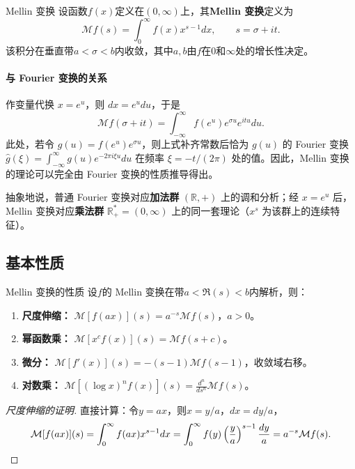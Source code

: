 \begin{definition}{Mellin 变换}{}
设函数$f(x)$定义在$(0,\infty)$上，其\textbf{Mellin 变换}定义为
\[
\mathcal{M}f(s) = \int_0^{\infty} f(x) x^{s-1} dx, \qquad s = \sigma + it.
\]
该积分在垂直带$a < \sigma < b$内收敛，其中$a,b$由$f$在$0$和$\infty$处的增长性决定。
\end{definition}


\paragraph{与 Fourier 变换的关系}
作变量代换 $x = e^{u}$，则 $dx = e^{u}du$，于是
\[
\mathcal{M}f(\sigma + it) = \int_{-\infty}^{\infty} f(e^{u}) e^{\sigma u} e^{i t u} du.
\]
此处，若令 $g(u) = f(e^u) e^{\sigma u}$，则上式补齐常数后恰为 $g(u)$ 的 Fourier 变换 $\hat{g}(\xi) = \int_{-\infty}^\infty g(u) e^{-2\pi i \xi u} du$ 在频率 $\xi = -t/(2\pi)$ 处的值。因此，Mellin 变换的理论可以完全由 Fourier 变换的性质推导得出。

抽象地说，普通 Fourier 变换对应\textbf{加法群} $(\mathbb{R},+)$ 上的调和分析；经 $x=e^u$ 后，Mellin 变换对应\textbf{乘法群} $\mathbb{R}_+^*=(0,\infty)$ 上的同一套理论（$x^{s}$ 为该群上的连续特征）。


\subsection{基本性质}

\begin{theorem}{Mellin 变换的性质}{}
设$f$的 Mellin 变换在带$a < \Re(s) < b$内解析，则：
\begin{enumerate}
    \item \textbf{尺度伸缩：} $\mathcal{M}[f(ax)](s) = a^{-s} \mathcal{M}f(s)$，$a>0$。
    \item \textbf{幂函数乘：} $\mathcal{M}[x^c f(x)](s) = \mathcal{M}f(s+c)$。
    \item \textbf{微分：} $\mathcal{M}[f'(x)](s) = -(s-1)\mathcal{M}f(s-1)$，收敛域右移。
    \item \textbf{对数乘：} $\mathcal{M}[(\log x)^n f(x)](s) = \frac{d^n}{ds^n}\mathcal{M}f(s)$。
\end{enumerate}
\end{theorem}

\begin{proof}[尺度伸缩的证明]
直接计算：令$y = ax$，则$x = y/a$，$dx = dy/a$，
\[
\mathcal{M}[f(ax)](s) = \int_0^{\infty} f(ax) x^{s-1} dx
= \int_0^{\infty} f(y) \left(\frac{y}{a}\right)^{s-1} \frac{dy}{a}
= a^{-s} \mathcal{M}f(s). \qedhere
\]
\end{proof}

